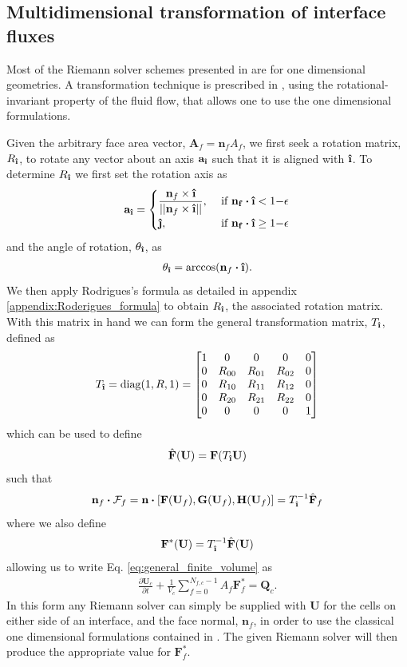 \documentclass[10pt,letterpaper,notitlepage]{article}
\numberwithin{equation}{section}
\newcommand{\partialderiv}[2]{\frac{\partial #1}{\partial #2}}
\newcommand{\dotp}{\boldsymbol{\cdot}}
\newcommand{\uvec}[1]{\boldsymbol{\hat{\textbf{#1}}}}
\newcommand{\ihat}{\uvec{\i}}
\newcommand{\jhat}{\uvec{\j}}
\newcommand{\hatbf}[1]{\hat{\mathbf{#1}}}
\newcommand{\beqn}{\begin{equation}\begin{aligned}}
\newcommand{\eeqn}{\end{aligned}\end{equation}}
\begin{document}
\vspace{1cm}
\subsection{Multidimensional transformation of interface fluxes} \label{section:3dtransformation}
Most of the Riemann solver schemes presented in \cite{Toro} are for one dimensional geometries. A transformation technique is prescribed in \cite{Toro}, using the rotational-invariant property of the fluid flow, that allows one to use the one dimensional formulations.

Given the arbitrary face area vector, $\mathbf{A}_f=\mathbf{n}_f A_f$, we first seek a rotation matrix, $R_{\ihat}$, to rotate any vector about an axis $\mathbf{a}_{\ihat}$ such that it is aligned with $\ihat$. To determine $R_{\ihat}$ we first set the rotation axis as
\beqn 
\mathbf{a}_{\ihat} = 
\begin{cases}
\dfrac{\mathbf{n}_f \times \ihat}{||\mathbf{n}_f \times \ihat||}, &\text{ if } \mathbf{n_f}\dotp \ihat < 1{-}\epsilon \\
\jhat, &\text{ if } \mathbf{n_f}\dotp \ihat \ge 1{-}\epsilon
\end{cases}
\eeqn 
and the angle of rotation, $\theta_{\ihat}$, as
\beqn 
\theta_{\ihat} = \arccos (\mathbf{n}_f \dotp \ihat).
\eeqn 
We then apply Rodrigues's formula as detailed in appendix \ref{appendix:Roderigues_formula} to obtain $R_{\ihat}$, the associated rotation matrix. With this matrix in hand we can form the general transformation matrix, $T_{\ihat}$, defined as
\beqn
T_{\ihat} = \text{diag}(1,R,1) = 
\begin{bmatrix}
1 & 0         & 0         & 0         & 0 \\
0 & R_{00} & R_{01} & R_{02} & 0 \\
0 & R_{10} & R_{11} & R_{12} & 0 \\
0 & R_{20} & R_{21} & R_{22} & 0 \\
0 & 0         & 0         & 0         & 1 \\
\end{bmatrix}
\eeqn
which can be used to define 
\beqn 
\hatbf{F} (\mathbf{U})= \mathbf{F}(T_{\ihat} \mathbf{U})
\eeqn 
such that
\beqn 
\mathbf{n}_f \dotp \mathcal{F}_f
= \mathbf{n} \dotp [
\mathbf{F}(\mathbf{U}_f),
\mathbf{G}(\mathbf{U}_f),
\mathbf{H}(\mathbf{U}_f)]
=
T_{\ihat}^{-1} \hatbf{F}_f
\eeqn 
where we also define
\beqn 
\mathbf{F}^*(\mathbf{U}) = T_{\ihat}^{-1} \hatbf{F} (\mathbf{U})
\eeqn 
allowing us to write Eq. \eqref{eq:general_finite_volume} as 
\beqn 
\partialderiv{\mathbf{U}_c}{t} 
+ 
\frac{1}{V_c}
\sum_{f=0}^{N_{f,c}{-}1} 
A_f  \mathbf{F}_f^*
=  \mathbf{Q}_c.
\eeqn 
In this form any Riemann solver can simply be supplied with $\mathbf{U}$ for the cells on either side of an interface, and the face normal, $\mathbf{n}_f$, in order to use the classical one dimensional formulations contained in \cite{Toro}. The given Riemann solver will then produce the appropriate value for $\mathbf{F}_f^*$.
\end{document}
